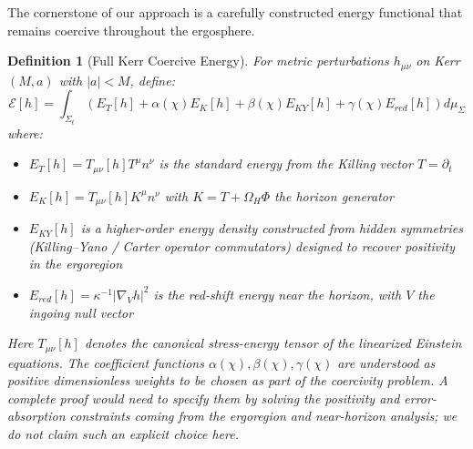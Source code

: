 \documentclass[12pt,a4paper]{article}
\newtheorem{definition}[theorem]{Definition}
\begin{document}
The cornerstone of our approach is a carefully constructed energy functional that remains coercive throughout the ergosphere.

\begin{definition}[Full Kerr Coercive Energy]\label{def:full-kerr-energy}
For metric perturbations $h_{\mu\nu}$ on Kerr$(M, a)$ with $|a| < M$, define:
\begin{equation}\label{eq:full-energy}
\mathcal{E}[h] = \int_{\Sigma_t} \left( E_T[h] + \alpha(\chi) E_K[h] + \beta(\chi) E_{KY}[h] + \gamma(\chi) E_{red}[h] \right) d\mu_{\Sigma}
\end{equation}
where:
\begin{itemize}
    \item $E_T[h] = T_{\mu\nu}[h] T^\mu n^\nu$ is the standard energy from the Killing vector $T = \partial_t$
    \item $E_K[h] = T_{\mu\nu}[h] K^\mu n^\nu$ with $K = T + \Omega_H \Phi$ the horizon generator
    \item $E_{KY}[h]$ is a higher-order energy density constructed from hidden symmetries (Killing--Yano / Carter operator commutators) designed to recover positivity in the ergoregion
    \item $E_{red}[h] = \kappa^{-1} |\nabla_V h|^2$ is the red-shift energy near the horizon, with $V$ the ingoing null vector
\end{itemize}
Here $T_{\mu\nu}[h]$ denotes the canonical stress-energy tensor of the linearized Einstein equations.
The coefficient functions $\alpha(\chi),\beta(\chi),\gamma(\chi)$ are understood as positive dimensionless weights to be chosen as part of the coercivity problem. A complete proof would need to specify them by solving the positivity and error-absorption constraints coming from the ergoregion and near-horizon analysis; we do not claim such an explicit choice here.
\end{definition}
\end{document}
